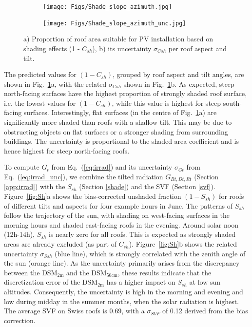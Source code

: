 \begin{figure}[tb]
\centering
\begin{subfigure}{.49\textwidth}
  \centering
  \texttt{[image: Figs/Shade\_slope\_azimuth.jpg]}
  \subcaption{}
\end{subfigure}
\begin{subfigure}{.49\textwidth}
  \centering
  \texttt{[image: Figs/Shade\_slope\_azimuth\_unc.jpg]}  
  \subcaption{}
\end{subfigure}
\caption{a) Proportion of roof area suitable for PV installation based on shading effects (1 - $C_{sh}$), b) its uncertainty $\sigma_{\mathit{Csh}}$ per roof aspect and tilt.}
\label{fig:Csh}
\end{figure}

The predicted values for $(1-C_{sh})$, grouped by roof aspect and tilt angles, are shown in Fig.~\ref{fig:Csh}a, with the related $\sigma_{\mathit{Csh}}$ shown in Fig.~\ref{fig:Csh}b. 
As expected, steep north-facing surfaces have the highest proportion of strongly shaded roof surface, i.e. the lowest values for $(1-C_{sh})$, while this value is highest for steep south-facing surfaces. 
Interestingly, flat surfaces (in the centre of  Fig.~\ref{fig:Csh}a) are significantly more shaded than roofs with a shallow tilt. This may be due to obstructing objects on flat surfaces or a stronger shading from surrounding buildings. 
The uncertainty is proportional to the shaded area coefficient and is hence highest for steep north-facing roofs. 


To compute $G_t$ from Eq.~(\ref{eq:irrad}) and its uncertainty $\sigma_{Gt}$ from Eq.~(\ref{eq:irrad_unc}), we combine the tilted radiation $G_{Bt,Dt,Rt}$ (Section \ref{app:irrad}) with the $S_{sh}$ (Section \ref{shade}) and the SVF (Section \ref{svf}).
%
Figure~\ref{fig:Sh}a shows the bias-corrected unshaded fraction $(1-S_{sh})$ for roofs of different tilts and aspects for four example hours in June. 
The patterns of $S_{sh}$ follow the trajectory of the sun, with shading on west-facing surfaces in the morning hours and shaded east-facing roofs in the evening.
Around solar noon (12h-14h), $S_{sh}$ is nearly zero for all roofs. This is expected as strongly shaded areas are already excluded (as part of $C_{sh}$). 
Figure~\ref{fig:Sh}b shows the related uncertainty $\sigma_{\mathit{Ssh}}$ (blue line), which is strongly correlated with the zenith angle of the sun (orange line). As the uncertainty primarily arises from the discrepancy between the DSM$_{2\text{m}}$ and the DSM$_{50\text{cm}}$, these results indicate that the discretization error of the DSM$_{2\text{m}}$ has a higher impact on $S_{sh}$ at low sun altitudes.
Consequently, the uncertainty is high in the morning and evening and low during midday in the summer months, when the solar radiation is highest. 
%
The average SVF on Swiss roofs is 0.69, with a $\sigma_{\mathit{SVF}}$ of 0.12 derived from the bias correction.

